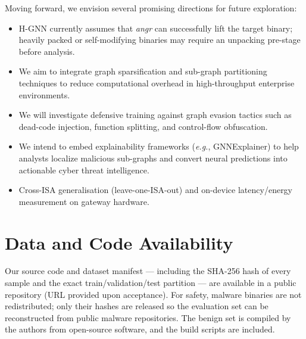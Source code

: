 \documentclass{llncs}
\newcommand{\method}{H-GNN}
\begin{document}
Moving forward, we envision several promising directions for future exploration:
\begin{itemize}
    \item {} \method{} currently assumes that \textit{angr}
    can successfully lift the target binary; heavily packed or self-modifying
    binaries may require an unpacking pre-stage before analysis.
    \item {} We aim to integrate
    graph sparsification and sub-graph partitioning techniques to reduce
    computational overhead in high-throughput enterprise environments.
    \item {} We will investigate defensive
    training against graph evasion tactics such as dead-code injection,
    function splitting, and control-flow obfuscation.
    \item {} We intend
    to embed explainability frameworks (\textit{e.g.}, GNNExplainer) to help
    analysts localize malicious sub-graphs and convert neural predictions into
    actionable cyber threat intelligence.
    \item Cross-ISA generalisation (leave-one-ISA-out) and on-device
    latency/energy measurement on gateway hardware.
\end{itemize}


\section*{Data and Code Availability}
Our source code and dataset manifest --- including the SHA-256 hash of every sample and the exact
train/validation/test partition --- are available in a public repository (URL provided upon acceptance). For safety, malware binaries
are not redistributed; only their hashes are released so the evaluation set can be reconstructed from
public malware repositories. The benign set is compiled by the authors from open-source software, and
the build scripts are included.




\end{document}
